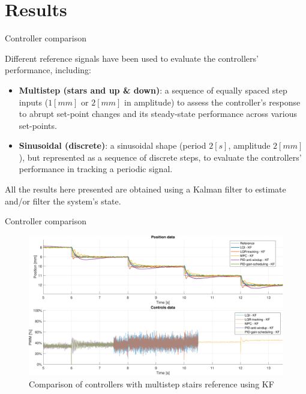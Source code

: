 \section{Results}

\begin{frame}{Controller comparison}

    Different reference signals have been used to evaluate the controllers' performance, including:

    \begin{itemize}
        \item \textbf{Multistep (stars and up \& down)}: a sequence of equally spaced step inputs ($1[mm]$ or $2[mm]$ in amplitude) to assess the controller's response to abrupt set-point changes and its steady-state performance across various set-points.
        \item \textbf{Sinusoidal (discrete)}: a sinusoidal shape (period $2[s]$, amplitude $2[mm]$), but represented as a sequence of discrete steps, to evaluate the controllers' performance in tracking a periodic signal.
    \end{itemize}

    \vspace{9pt}

    All the results here presented are obtained using a Kalman filter to estimate and/or filter the system's state.

\end{frame}



\begin{frame}{Controller comparison}

    \vspace{9pt}

    \begin{figure}[H]
        \centering
        \includegraphics[width=1\linewidth]{./img/MATLAB/results/multisteps_stairs_star_KF.pdf}
        \caption{Comparison of controllers with multistep stairs reference using KF}
    \end{figure}

\end{frame}



